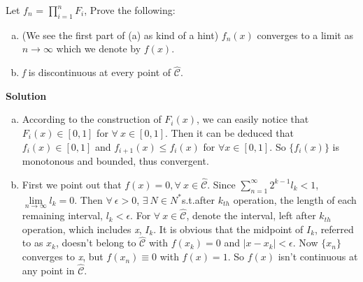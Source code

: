 \documentclass{article}
\begin{document}
Let $f_n$ = $\prod_{i=1}^{n} F_i$, Prove the following:
\begin{enumerate}[(a)]
	\item (We see the first part of (a) as kind of a hint) $f_n(x)$ converges to a limit as $n\to\infty$ which we denote by  $f(x)$.
	\item \emph{f} is discontinuous at every point of $\hat{\mathcal{C}}$.
\end{enumerate}
\Large{\textbf{Solution}}\
	\begin{enumerate}[(a)]
		\item According to the construction of $F_i(x)$, we can easily notice that $F_i(x)\in[0,1]$ for $\forall\ x \in [0,1]$. Then it can be deduced that $f_i(x)\in[0,1]$ and $f_{i+1}(x) \leq f_{i}(x)$ for $\forall x \in [0,1]$. So $\{f_i(x)\}$ is monotonous and bounded, thus convergent.
		\item First we point out that $f(x) = 0, \forall\ x \in \hat{\mathcal{C}}$. Since $\sum^{\infty}_{n=1} {2^{k-1}l_k<1}$, \ $\lim\limits_{n\to\infty}l_k = 0$. Then $\forall\ \epsilon > 0$, $\exists\ N \in N^{*}$\;s.t.\;after $k_{th}$ operation, the length of each remaining interval, $l_{k} < \epsilon$. For $\forall\ x \in \hat{\mathcal{C}}$, denote the interval, left after $k_{th}$ operation, which includes \emph{x}, $I_k$. It is obvious that the midpoint of $I_k$, referred to as $x_k$, doesn't belong to $\hat{\mathcal{C}}$ with $f(x_k) = 0$ and $|x - x_k| < \epsilon$. Now $\{x_n\}$ converges to \emph{x}, but $f(x_n) \equiv 0$ with $f(x) = 1$. So $f(x)$ isn't continuous at any point in $\hat{\mathcal{C}}$.
	\end{enumerate}
\end{document}
